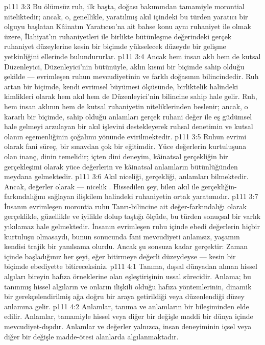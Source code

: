 \vs p111 3:3 Bu ölümsüz ruh, ilk başta, doğası bakımından tamamiyle morontial niteliktedir; ancak, o, genellikle, yaratılmış akıl içindeki bu türden yaratıcı bir olguyu başlatan Kâinatın Yaratıcısı’na ait bahse konu aynı ruhaniyet ile olmak üzere, İlahiyat’ın ruhaniyetleri ile birlikte bütünleşme değerindeki gerçek ruhaniyet düzeylerine kesin bir biçimde yükselecek düzeyde bir gelişme yetkinliğini ellerinde bulundururlar.
\vs p111 3:4 Ancak hem insan aklı hem de kutsal Düzenleyici, Düzenleyici’nin bütünüyle, aklın kısmi bir biçimde sahip olduğu şekilde --- evrimleşen ruhun mevcudiyetinin ve farklı doğasının bilincindedir. Ruh artan bir biçimde, kendi evrimsel büyümesi ölçüsünde, birliktelik halindeki kimlikleri olarak hem akıl hem de Düzenleyici’nin bilincine sahip hale gelir. Ruh, hem insan aklının hem de kutsal ruhaniyetin niteliklerinden beslenir; ancak, o kararlı bir biçimde, sahip olduğu anlamları gerçek ruhani değer ile eş güdümsel hale gelmeyi arzulayan bir akıl işlevini destekleyerek ruhsal denetimin ve kutsal olanın egemenliğinin çoğalımı yönünde evirilmektedir.
\vs p111 3:5 Ruhun evrimi olarak fani süreç, bir sınavdan çok bir eğitimdir. Yüce değerlerin kurtuluşuna olan inanç, dinin temelidir; içten dini deneyim, kâinatsal gerçekliğin bir gerçekleşimi olarak yüce değerlerin ve kâinatsal anlamların bütünlüğünden meydana gelmektedir.
\vs p111 3:6 Akıl niceliği, gerçekliği, anlamları bilmektedir. Ancak, değerler olarak --- nicelik . Hissedilen şey, bilen akıl ile gerçekliğin\hyp{}farkındalığını sağlayan ilişkilem halindeki ruhaniyetin ortak yaratımıdır.
\vs p111 3:7 İnsanın evrimleşen morontia ruhu Tanrı\hyp{}bilincine ait değer\hyp{}farkındalığı olarak gerçeklikle, güzellikle ve iyilikle dolup taştığı ölçüde, bu türden sonuçsal bir varlık yıkılamaz hale gelmektedir. İnsanın evrimleşen ruhu içinde ebedi değerlerin hiçbir kurtuluşu olmasaydı, bunun sonucunda fani mevcudiyeti anlamsız, yaşamın kendisi trajik bir yanılsama olurdu. Ancak şu sonsuza kadar gerçektir: Zaman içinde başladığınız her şeyi, eğer bitirmeye değerli düzeydeyse --- kesin bir biçimde ebediyette bitireceksiniz.
\vs p111 4:1 Tanıma, dışsal dünyadan alınan hissel algıları bireyin hafıza örneklerine olan eşleştirişinin ussal sürecidir. Anlama; bu tanınmış hissel algıların ve onların ilişkili olduğu hafıza yöntemlerinin, dinamik bir gerekçelendirilmiş ağa doğru bir araya getirildiği veya düzenlendiği düzey anlamına gelir.
\vs p111 4:2 Anlamlar, tanıma ve anlamların bir bileşiminden elde edilir. Anlamlar, tamamiyle hissel veya diğer bir değişle maddi bir dünya içinde mevcudiyet\hyp{}dışıdır. Anlamlar ve değerler yalnızca, insan deneyiminin içsel veya diğer bir değişle madde\hyp{}ötesi alanlarda algılanmaktadır.
